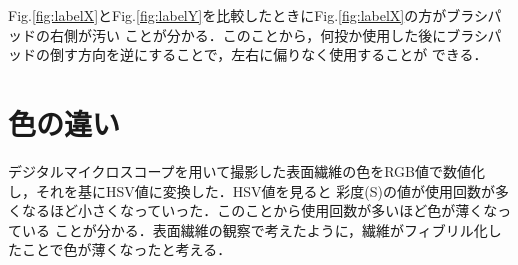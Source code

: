 \documentclass[main]{subfiles}
\begin{document}
Fig.\ref{fig:labelX}とFig.\ref{fig:labelY}を比較したときにFig.\ref{fig:labelX}の方がブラシパッドの右側が汚い
ことが分かる．このことから，何投か使用した後にブラシパッドの倒す方向を逆にすることで，左右に偏りなく使用することが
できる．
\\

\section{色の違い}
デジタルマイクロスコープを用いて撮影した表面繊維の色をRGB値で数値化し，それを基にHSV値に変換した．HSV値を見ると
彩度(S)の値が使用回数が多くなるほど小さくなっていった．このことから使用回数が多いほど色が薄くなっている
ことが分かる．表面繊維の観察で考えたように，繊維がフィブリル化したことで色が薄くなったと考える．
\end{document}
